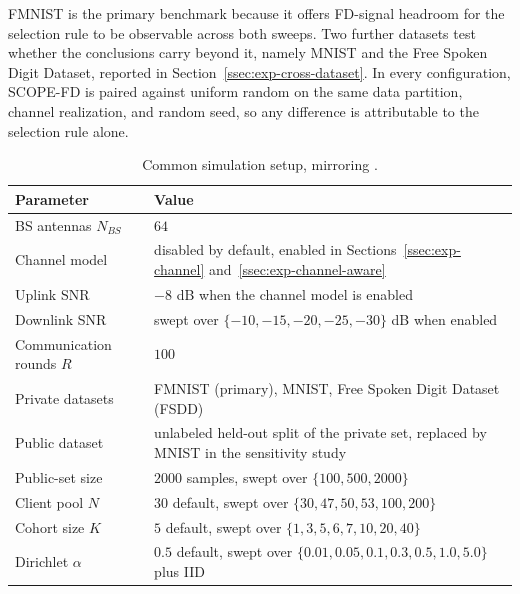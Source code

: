 \documentclass[journal]{IEEEtran}
\newcommand{\rev}[1]{#1}
\begin{document}
FMNIST is the primary benchmark because it offers FD-signal headroom for the selection rule to be observable across both sweeps. \rev{Two further datasets test whether the conclusions carry beyond it, namely MNIST and the Free Spoken Digit Dataset, reported in Section~\ref{ssec:exp-cross-dataset}.}
In every configuration, SCOPE-FD is paired against uniform random on the same data partition, channel realization, and random seed, so any difference is attributable to the selection rule alone. %

\begin{table}[t]
\centering
\caption{Common simulation setup, mirroring \cite{mu2024fedtskd}.}
\label{tab:setup}
\renewcommand{\arraystretch}{1.25}
\footnotesize
\setlength{\tabcolsep}{4pt}
\begin{tabular}{@{}>{\raggedright\arraybackslash}m{}>{\raggedright\arraybackslash}m{}@{}}
\toprule
\textbf{Parameter} & \textbf{Value} \\
\midrule
BS antennas $N_{BS}$ & $64$ \\
\rev{Channel model} & \rev{disabled by default, enabled in Sections~\ref{ssec:exp-channel} and~\ref{ssec:exp-channel-aware}} \\
\rev{Uplink SNR} & \rev{$-8$ dB when the channel model is enabled} \\
\rev{Downlink SNR} & \rev{swept over $\{-10,-15,-20,-25,-30\}$ dB when enabled} \\
Communication rounds $R$ & $100$ \\
Private datasets & \rev{FMNIST (primary), MNIST, Free Spoken Digit Dataset (FSDD)} \\
Public dataset & \rev{unlabeled held-out split of the private set, replaced by MNIST in the sensitivity study} \\
\rev{Public-set size} & \rev{$2000$ samples, swept over $\{100, 500, 2000\}$} \\
\rev{Client pool $N$} & \rev{$30$ default, swept over $\{30,47,50,53,100,200\}$} \\
\rev{Cohort size $K$} & \rev{$5$ default, swept over $\{1,3,5,6,7,10,20,40\}$} \\
Dirichlet $\alpha$ & \rev{$0.5$ default, swept over $\{0.01,0.05,0.1,0.3,0.5,1.0,5.0\}$ plus IID} \\

\end{tabular}
\end{table}
\end{document}
